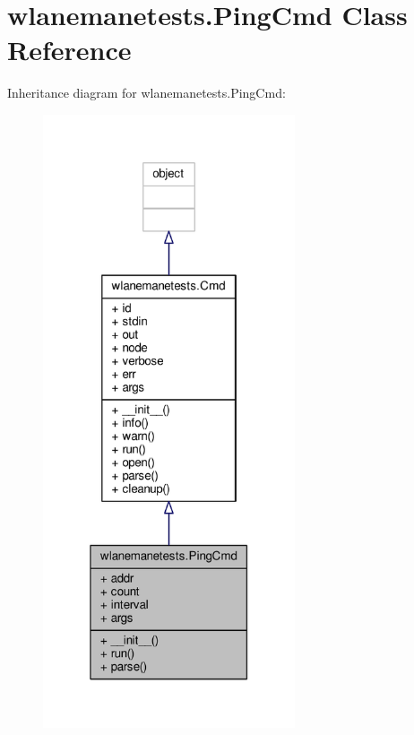 \hypertarget{classwlanemanetests_1_1_ping_cmd}{\section{wlanemanetests.\+Ping\+Cmd Class Reference}
\label{classwlanemanetests_1_1_ping_cmd}
}


Inheritance diagram for wlanemanetests.\+Ping\+Cmd\+:
\nopagebreak
\begin{figure}[H]
\begin{center}
\leavevmode
\includegraphics[width=211pt]{classwlanemanetests_1_1_ping_cmd__inherit__graph}
\end{center}
\end{figure}


